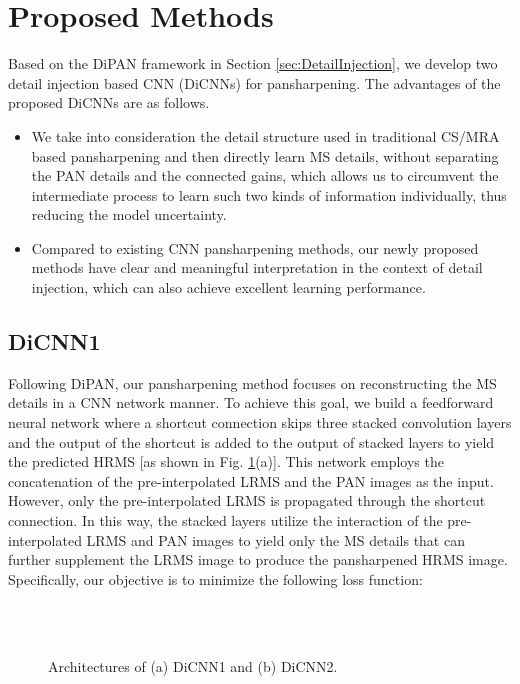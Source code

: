 \documentclass[journal]{IEEEtran}
\begin{document}
\section{Proposed Methods}\label{sec:Methods}

Based on the DiPAN framework in Section \ref{sec:DetailInjection}, we develop two detail injection based CNN (DiCNNs) for pansharpening. The advantages of the proposed DiCNNs are as follows.
\begin{itemize}
\item We take into consideration the detail structure used in traditional CS/MRA based pansharpening and then directly learn MS details, without separating the PAN details and the connected gains, which allows us to circumvent the intermediate process to learn such two kinds of information individually, thus reducing the model uncertainty.

\item Compared to existing CNN pansharpening methods, our newly proposed methods have clear and meaningful interpretation in the context of detail injection, which can also achieve excellent learning performance.

\end{itemize}

\subsection{DiCNN1}
Following DiPAN, our pansharpening method focuses on reconstructing the MS details in a CNN network manner. To achieve this goal, we build a feedforward neural network where a shortcut connection skips three stacked convolution layers and the output of the shortcut is added to the output of stacked layers to yield the predicted HRMS [as shown in Fig. \ref{fig:NetStructure}(a)]. This network employs the concatenation of the pre-interpolated LRMS and the PAN images as the input. However, only the pre-interpolated LRMS is propagated through the shortcut connection. In this way, the stacked layers utilize the interaction of the pre-interpolated LRMS and PAN images to yield only the MS details  that can further supplement the LRMS image to produce the pansharpened HRMS image. Specifically, our objective is to minimize the following loss function:

\begin{figure}[ht]
\centering
{}
\\[-1pt]

\\[-1pt]

\caption{Architectures of (a) DiCNN1 and (b) DiCNN2.}
\label{fig:NetStructure}
\end{figure}
\end{document}

